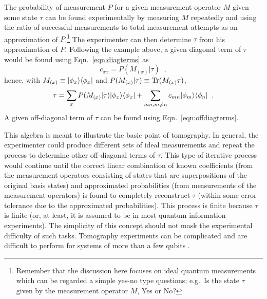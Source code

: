 The probability of measurement $P$ for a given measurement operator $M$ given some state $\tau$ can be found experimentally by measuring $M$ repeatedly and using the ratio of successful measurements to total measurement attempts as an approximation of $P$.\footnote{Remember that the discussion here focuses on ideal quantum measurements which can be regarded a simple yes-no type questions; e.g.\ Is the state $\tau$ given by the measurement operator $M$, Yes or No?}  The experimenter can then determine $\tau$ from his approximation of $P$.  Following the example above, a given diagonal term of $\tau$ would be found using Eqn.\ \ref{eqn:diagterms} as
$$
c_{xx} = P(M_{(x)}|\tau)\;\;,
$$
hence, with $M_{(x)} \equiv |\phi_x\rangle\langle\phi_x|$ and $P(M_{(x)}|\tau) \equiv \operatorname{Tr}(M_{(x)}\tau)$,
$$
\tau = \sum_{x} P(M_{(x)}|\tau) |\phi_x\rangle\langle\phi_x| + \sum_{mn,m\neq n} c_{mn} |\phi_m\rangle\langle\phi_n|\;\;.
$$  
A given off-diagonal term of $\tau$ can be found using Eqn.\ \ref{eqn:offdiagterms}. 

This algebra is meant to illustrate the basic point of tomography.  In general, the experimenter could produce different sets of ideal measurements and repeat the process to determine other off-diagonal terms of $\tau$.  This type of iterative process would continue until the correct linear combination of known coefficients (from the measurement operators consisting of states that are superpositions of the original basis states) and approximated probabilities (from measurements of the measurement operators) is found to completely reconstruct $\tau$ (within some error tolerance due to the approximated probabilities).  This process is finite because $\tau$ is finite (or, at least, it is assumed to be in most quantum information experiments).  The simplicity of this concept should not mask the experimental difficulty of such tasks.  Tomography experiments can be complicated and are difficult to perform for systems of more than a few qubits \cite{Paris2004}.

